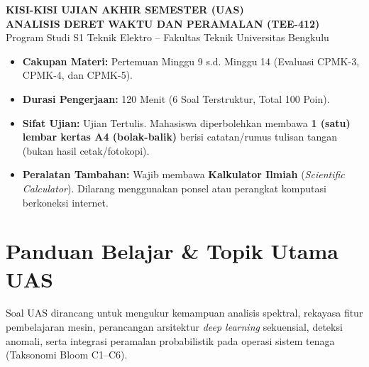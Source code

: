 \documentclass[11pt,a4paper]{article}
\begin{document}
\begin{center}
    {\large \textbf{\color{primaryblue}KISI-KISI UJIAN AKHIR SEMESTER (UAS)}}\\[0.15cm]
    {\Large \textbf{\color{goldaccent}ANALISIS DERET WAKTU DAN PERAMALAN (TEE-412)}}\\[0.1cm]
    {\normalsize Program Studi S1 Teknik Elektro -- Fakultas Teknik Universitas Bengkulu}
\end{center}

\vspace{0.3cm}

\begin{tcolorbox}[colback=boxbg,colframe=primaryblue,arc=2mm,title=\textbf{Informasi Pelaksanaan Ujian Akhir Semester}]
\small
\begin{itemize}[leftmargin=1.5em, itemsep=3pt]
    \item \textbf{Cakupan Materi:} Pertemuan Minggu 9 s.d. Minggu 14 (Evaluasi CPMK-3, CPMK-4, dan CPMK-5).
    \item \textbf{Durasi Pengerjaan:} 120 Menit (6 Soal Terstruktur, Total 100 Poin).
    \item \textbf{Sifat Ujian:} Ujian Tertulis. Mahasiswa diperbolehkan membawa \textbf{1 (satu) lembar kertas A4 (bolak-balik)} berisi catatan/rumus tulisan tangan (bukan hasil cetak/fotokopi).
    \item \textbf{Peralatan Tambahan:} Wajib membawa \textbf{Kalkulator Ilmiah} (\textit{Scientific Calculator}). Dilarang menggunakan ponsel atau perangkat komputasi berkoneksi internet.
\end{itemize}
\end{tcolorbox}

\vspace{0.35cm}
\section{Panduan Belajar \& Topik Utama UAS}

Soal UAS dirancang untuk mengukur kemampuan analisis spektral, rekayasa fitur pembelajaran mesin, perancangan arsitektur \textit{deep learning} sekuensial, deteksi anomali, serta integrasi peramalan probabilistik pada operasi sistem tenaga (Taksonomi Bloom C1--C6).
\end{document}
